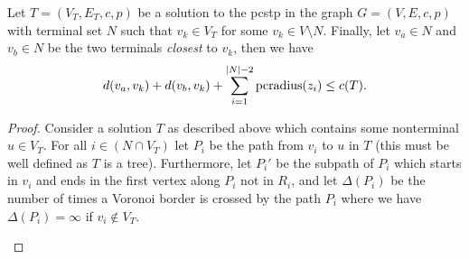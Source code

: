 \begin{theorem}\label{thm:vor:1}
  Let $T = (V_T, E_T, c, p)$ be a solution to the \gls{pcstp} in the graph $G = (V, E, c, p)$ with terminal set $N$ such that
  $v_k \in V_T$ for some $v_k \in V \setminus N$. Finally, let $v_a \in N$ and $v_b \in N$ be the two terminals \textit{closest}
  to $v_k$, then we have
  \[d(v_a, v_k) + d(v_b, v_k) + \sum_{i = 1}^{|N| - 2} \operatorname{pcradius}(z_i) \leq c(T)\mathnormal{.}\]
\end{theorem}
\begin{proof}
  Consider a solution $T$ as described above which contains some nonterminal $u \in V_T$.
  For all $i \in (N \cap V_T)$ let $P_i$ be the
  path from $v_i$ to $u$ in $T$ (this must be well defined as $T$ is a tree). Furthermore,
  let $P_i'$ be the subpath of $P_i$ which starts in $v_i$ and ends in the first vertex along
  $P_i$ not in $R_i$, and
  let $\Delta(P_i)$ be the number of times a Voronoi border is crossed by the path $P_i$ where
  we have $\Delta(P_i) = \infty$ if $v_i \not\in V_T$.

  \begin{figure}[h!]
     \centering
\end{figure}
\end{proof}
